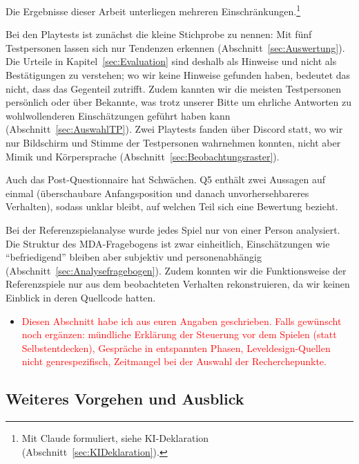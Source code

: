 \documentclass[../Main.tex]{subfiles}
\begin{document}
Die Ergebnisse dieser Arbeit unterliegen mehreren Einschränkungen.\footnote{Mit Claude formuliert, siehe KI-Deklaration (Abschnitt~\ref{sec:KIDeklaration}).}

Bei den Playtests ist zunächst die kleine Stichprobe zu nennen: Mit fünf Testpersonen lassen sich nur Tendenzen erkennen (Abschnitt~\ref{sec:Auswertung}). Die Urteile in Kapitel~\ref{sec:Evaluation} sind deshalb als Hinweise und nicht als Bestätigungen zu verstehen; wo wir keine Hinweise gefunden haben, bedeutet das nicht, dass das Gegenteil zutrifft. Zudem kannten wir die meisten Testpersonen persönlich oder über Bekannte, was trotz unserer Bitte um ehrliche Antworten zu wohlwollenderen Einschätzungen geführt haben kann (Abschnitt~\ref{sec:AuswahlTP}). Zwei Playtests fanden über Discord statt, wo wir nur Bildschirm und Stimme der Testpersonen wahrnehmen konnten, nicht aber Mimik und Körpersprache (Abschnitt~\ref{sec:Beobachtungsraster}).

Auch das Post-Questionnaire hat Schwächen. Q5 enthält zwei Aussagen auf einmal (überschaubare Anfangsposition und danach unvorhersehbareres Verhalten), sodass unklar bleibt, auf welchen Teil sich eine Bewertung bezieht.

Bei der Referenzspielanalyse wurde jedes Spiel nur von einer Person analysiert. Die Struktur des MDA-Fragebogens ist zwar einheitlich, Einschätzungen wie \enquote{befriedigend} bleiben aber subjektiv und personenabhängig (Abschnitt~\ref{sec:Analysefragebogen}). Zudem konnten wir die Funktionsweise der Referenzspiele nur aus dem beobachteten Verhalten rekonstruieren, da wir keinen Einblick in deren Quellcode hatten.

\begin{itemize}[leftmargin=1.5cm]
    \item \textcolor{red}{Diesen Abschnitt habe ich aus euren Angaben geschrieben. Falls gewünscht noch ergänzen: mündliche Erklärung der Steuerung vor dem Spielen (statt Selbstentdecken), Gespräche in entspannten Phasen, Leveldesign-Quellen nicht genrespezifisch, Zeitmangel bei der Auswahl der Recherchepunkte.}
\end{itemize}

\subsection{Weiteres Vorgehen und Ausblick} \label{sec:Verbesserungen}
\end{document}
